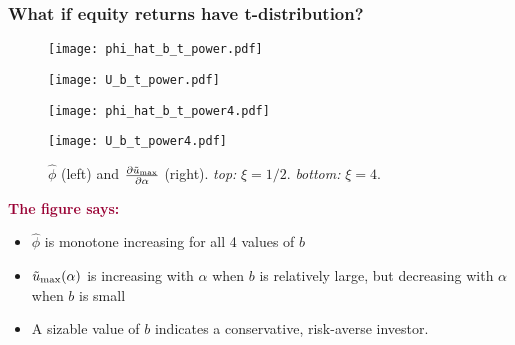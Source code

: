 \documentclass{beamer}
\begin{document}
\begin{frame}
  \frametitle{What if equity returns have t-distribution?}
  \begin{minipage}[t]{0.5\linewidth}
    \begin{figure}[htb!]
      \begin{minipage}{0.5\linewidth}
        \texttt{[image: phi\_hat\_b\_t\_power.pdf]}
      \end{minipage}\hfill
      \begin{minipage}{0.5\linewidth}
        \texttt{[image: U\_b\_t\_power.pdf]}
      \end{minipage}
      \begin{minipage}{0.5\linewidth}
        \texttt{[image: phi\_hat\_b\_t\_power4.pdf]}
      \end{minipage}\hfill
      \begin{minipage}{0.5\linewidth}
        \texttt{[image: U\_b\_t\_power4.pdf]}
      \end{minipage}
      \caption{$\hat\phi$ (left) and
        ${\partial \tilde u_{\rm max} \over \partial \alpha}$ (right).
        {\em top:} $\xi = 1/2$. {\em bottom:} $\xi = 4$.
      }
      \label{fig:htfg}
    \end{figure}
  \end{minipage}\hfill
  \begin{minipage}[t]{0.5\linewidth}
    \textcolor[HTML]{990033}{\bf The figure says:}
    \begin{itemize}
    \item  $\hat\phi$ is monotone increasing for all 4 values of $b$
    \item $\tilde u_{\rm max}(\alpha)$ is increasing with $\alpha$
      when $b$ is relatively large, but  decreasing with $\alpha$ when
      $b$ is small
    \item A sizable value of $b$ indicates a conservative, risk-averse investor.
    \end{itemize}
  \end{minipage}
\end{frame}
\end{document}
